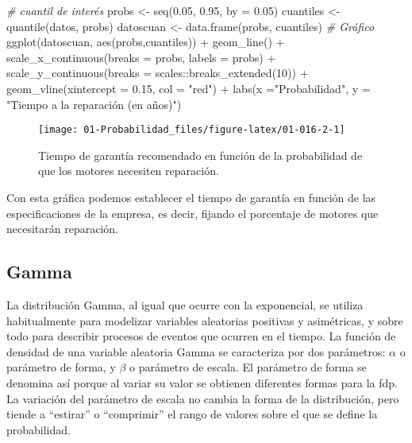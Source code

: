 \documentclass[
]{book}
\newenvironment{Shaded}{\begin{snugshade}}{\end{snugshade}}
\newcommand{\AttributeTok}[1]{\textcolor[rgb]{0.77,0.63,0.00}{#1}}
\newcommand{\CommentTok}[1]{\textcolor[rgb]{0.56,0.35,0.01}{\textit{#1}}}
\newcommand{\DecValTok}[1]{\textcolor[rgb]{0.00,0.00,0.81}{#1}}
\newcommand{\FloatTok}[1]{\textcolor[rgb]{0.00,0.00,0.81}{#1}}
\newcommand{\FunctionTok}[1]{\textcolor[rgb]{0.00,0.00,0.00}{#1}}
\newcommand{\NormalTok}[1]{#1}
\newcommand{\OtherTok}[1]{\textcolor[rgb]{0.56,0.35,0.01}{#1}}
\newcommand{\SpecialCharTok}[1]{\textcolor[rgb]{0.00,0.00,0.00}{#1}}
\newcommand{\StringTok}[1]{\textcolor[rgb]{0.31,0.60,0.02}{#1}}
\theoremstyle{definition}
\theoremstyle{definition}
\theoremstyle{definition}
\theoremstyle{definition}
\theoremstyle{remark}
\begin{document}
\begin{Shaded}
\begin{Highlighting}[]
\CommentTok{\# cuantil de interés}
\NormalTok{probs }\OtherTok{\textless{}{-}} \FunctionTok{seq}\NormalTok{(}\FloatTok{0.05}\NormalTok{, }\FloatTok{0.95}\NormalTok{, }\AttributeTok{by =} \FloatTok{0.05}\NormalTok{)}
\NormalTok{cuantiles }\OtherTok{\textless{}{-}} \FunctionTok{quantile}\NormalTok{(datos, probs)}
\NormalTok{datoscuan }\OtherTok{\textless{}{-}} \FunctionTok{data.frame}\NormalTok{(probs, cuantiles)}
\CommentTok{\# Gráfico}
\FunctionTok{ggplot}\NormalTok{(datoscuan, }\FunctionTok{aes}\NormalTok{(probs,cuantiles)) }\SpecialCharTok{+} 
  \FunctionTok{geom\_line}\NormalTok{() }\SpecialCharTok{+}
  \FunctionTok{scale\_x\_continuous}\NormalTok{(}\AttributeTok{breaks =}\NormalTok{ probs, }\AttributeTok{labels =}\NormalTok{ probs) }\SpecialCharTok{+}
  \FunctionTok{scale\_y\_continuous}\NormalTok{(}\AttributeTok{breaks =}\NormalTok{ scales}\SpecialCharTok{::}\FunctionTok{breaks\_extended}\NormalTok{(}\DecValTok{10}\NormalTok{)) }\SpecialCharTok{+}
  \FunctionTok{geom\_vline}\NormalTok{(}\AttributeTok{xintercept =} \FloatTok{0.15}\NormalTok{, }\AttributeTok{col =} \StringTok{"red"}\NormalTok{) }\SpecialCharTok{+}
  \FunctionTok{labs}\NormalTok{(}\AttributeTok{x =}\StringTok{"Probabilidad"}\NormalTok{, }\AttributeTok{y =} \StringTok{"Tiempo a la reparación (en años)"}\NormalTok{)  }
\end{Highlighting}
\end{Shaded}

\begin{figure}

{\centering \texttt{[image: 01-Probabilidad\_files/figure-latex/01-016-2-1]} 

}

\caption{Tiempo de garantía recomendado en función de la probabilidad de que los motores necesiten reparación.}\label{fig:01-016-2}
\end{figure}

Con esta gráfica podemos establecer el tiempo de garantía en función de las especificaciones de la empresa, es decir, fijando el porcentaje de motores que necesitarán reparación.

\hypertarget{gamma}{%
\subsection{Gamma}\label{gamma}}

La distribución Gamma, al igual que ocurre con la exponencial, se utiliza habitualmente para modelizar variables aleatorias positivas y asimétricas, y sobre todo para describir procesos de eventos que ocurren en el tiempo. La función de densidad de una variable aleatoria Gamma se caracteriza por dos parámetros: \(\alpha\) o parámetro de forma, y \(\beta\) o parámetro de escala. El parámetro de forma se denomina así porque al variar su valor se obtienen diferentes formas para la fdp. La variación del parámetro de escala no cambia la forma de la distribución, pero tiende a ``estirar'' o ``comprimir'' el rango de valores sobre el que se define la probabilidad.
\end{document}

